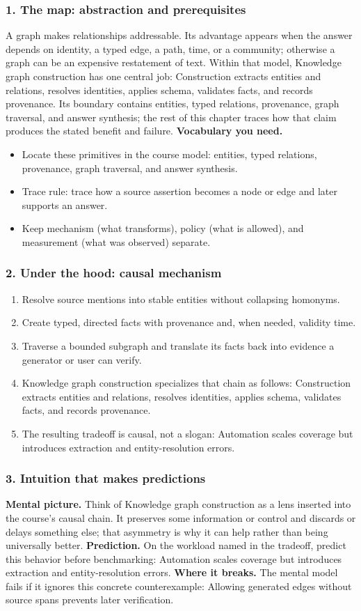 \subsubsection*{1. The map: abstraction and prerequisites}
A graph makes relationships addressable. Its advantage appears when the answer depends on identity, a typed edge, a path, time, or a community; otherwise a graph can be an expensive restatement of text.
Within that model, Knowledge graph construction has one central job: Construction extracts entities and relations, resolves identities, applies schema, validates facts, and records provenance. Its boundary contains entities, typed relations, provenance, graph traversal, and answer synthesis; the rest of this chapter traces how that claim produces the stated benefit and failure.
\textbf{Vocabulary you need.}\begin{itemize}
\item Locate these primitives in the course model: entities, typed relations, provenance, graph traversal, and answer synthesis.
\item Trace rule: trace how a source assertion becomes a node or edge and later supports an answer.
\item Keep mechanism (what transforms), policy (what is allowed), and measurement (what was observed) separate.
\end{itemize}
\subsubsection*{2. Under the hood: causal mechanism}\begin{enumerate}
\item Resolve source mentions into stable entities without collapsing homonyms.
\item Create typed, directed facts with provenance and, when needed, validity time.
\item Traverse a bounded subgraph and translate its facts back into evidence a generator or user can verify.
\item Knowledge graph construction specializes that chain as follows: Construction extracts entities and relations, resolves identities, applies schema, validates facts, and records provenance.
\item The resulting tradeoff is causal, not a slogan: Automation scales coverage but introduces extraction and entity-resolution errors.
\end{enumerate}
\subsubsection*{3. Intuition that makes predictions}
\textbf{Mental picture.} Think of Knowledge graph construction as a lens inserted into the course's causal chain. It preserves some information or control and discards or delays something else; that asymmetry is why it can help rather than being universally better.
\textbf{Prediction.} On the workload named in the tradeoff, predict this behavior before benchmarking: Automation scales coverage but introduces extraction and entity-resolution errors.
\textbf{Where it breaks.} The mental model fails if it ignores this concrete counterexample: Allowing generated edges without source spans prevents later verification.

